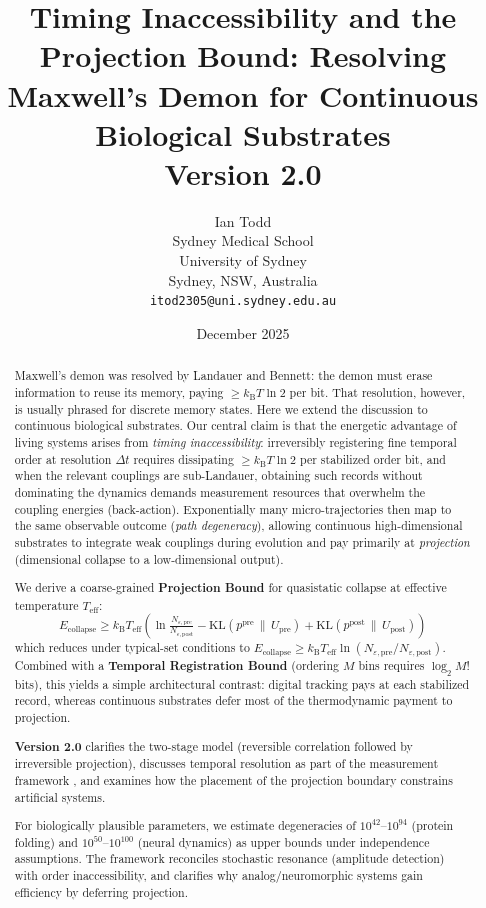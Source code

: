 \documentclass[12pt]{article}
\title{Timing Inaccessibility and the Projection Bound: Resolving Maxwell's Demon for Continuous Biological Substrates\\[0.5em]\large Version 2.0}
\author{Ian Todd\\
Sydney Medical School\\
University of Sydney\\
Sydney, NSW, Australia\\
\texttt{itod2305@uni.sydney.edu.au}}
\date{December 2025}
\numberwithin{equation}{section}
\newcommand{\kB}{k_{\mathrm{B}}}
\newcommand{\Teff}{T_{\mathrm{eff}}}
\newcommand{\KL}[2]{\mathrm{KL}\!\left(#1\,\|\,#2\right)}
\begin{document}
\maketitle

\begin{abstract}
Maxwell's demon was resolved by Landauer and Bennett: the demon must erase information to reuse its memory, paying $\ge \kB T\ln 2$ per bit. That resolution, however, is usually phrased for discrete memory states. Here we extend the discussion to continuous biological substrates. Our central claim is that the energetic advantage of living systems arises from \emph{timing inaccessibility}: irreversibly registering fine temporal order at resolution $\Delta t$ requires dissipating $\ge \kB T\ln 2$ per stabilized order bit, and when the relevant couplings are sub-Landauer, obtaining such records without dominating the dynamics demands measurement resources that overwhelm the coupling energies (back-action). Exponentially many micro-trajectories then map to the same observable outcome (\emph{path degeneracy}), allowing continuous high-dimensional substrates to integrate weak couplings during evolution and pay primarily at \emph{projection} (dimensional collapse to a low-dimensional output).

We derive a coarse-grained \textbf{Projection Bound} for quasistatic collapse at effective temperature $\Teff$:
\begin{equation}
E_{\mathrm{collapse}} \ge \kB\Teff
\left(
\ln \tfrac{N_{\varepsilon,\mathrm{pre}}}{N_{\varepsilon,\mathrm{post}}}
- \KL{p^{\mathrm{pre}}}{U_{\mathrm{pre}}}
+ \KL{p^{\mathrm{post}}}{U_{\mathrm{post}}}
\right)
\end{equation}
which reduces under typical-set conditions to $E_{\mathrm{collapse}}\ge \kB\Teff\ln(N_{\varepsilon,\mathrm{pre}}/N_{\varepsilon,\mathrm{post}})$. Combined with a \textbf{Temporal Registration Bound} (ordering $M$ bins requires $\log_2 M!$ bits), this yields a simple architectural contrast: digital tracking pays at each stabilized record, whereas continuous substrates defer most of the thermodynamic payment to projection.

\textbf{Version 2.0} clarifies the two-stage model (reversible correlation followed by irreversible projection), discusses temporal resolution as part of the measurement framework \cite{todd2025biosystems}, and examines how the placement of the projection boundary constrains artificial systems.

For biologically plausible parameters, we estimate degeneracies of $10^{42}$--$10^{94}$ (protein folding) and $10^{50}$--$10^{100}$ (neural dynamics) as upper bounds under independence assumptions. The framework reconciles stochastic resonance (amplitude detection) with order inaccessibility, and clarifies why analog/neuromorphic systems gain efficiency by deferring projection.
\end{abstract}
\end{document}
